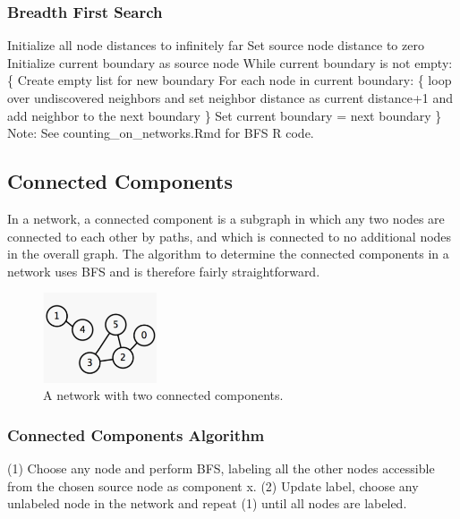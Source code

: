 \subsubsection*{Breadth First Search}
Initialize all node distances to infinitely far \newline
Set source node distance to zero \newline
Initialize current boundary as source node \newline \newline
While current boundary is not empty: \{ \newline
Create empty list for new boundary \newline
For each node in current boundary: \{ \newline
loop over undiscovered neighbors and set neighbor distance as current distance+1 and add neighbor to the next boundary \newline
\} \newline
Set current boundary = next boundary \newline
\} \newline \newline
Note: See counting\_on\_networks.Rmd for BFS R code.
\subsection{Connected Components}
In a network, a connected component is a subgraph in which any two nodes are connected to each other by paths, and which is connected to no additional nodes in the overall graph. The algorithm to determine the connected components in a network uses BFS and is therefore fairly straightforward.

\begin{figure}[ht]
  \begin{center}
    \includegraphics[width=0.3\textwidth]{figures/cc.png}
    \caption{
      A network with two connected components.}
    \label{fig:cc}
  \end{center}
\end{figure}

\subsubsection*{Connected Components Algorithm}
(1) Choose any node and perform BFS, labeling all the other nodes accessible from the chosen source node as component x. \newline
(2) Update label, choose any unlabeled node in the network and repeat (1) until all nodes are labeled.

